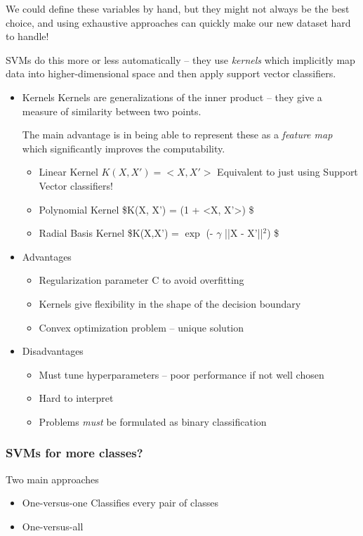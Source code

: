 \documentclass[11pt]{article}
\begin{document}
\begin{itemize}
We could define these variables by hand, but they might not always be the best choice, and using exhaustive approaches can quickly make our new dataset hard to handle!

SVMs do this more or less automatically -- they use \emph{kernels} which implicitly map data into higher-dimensional space and then apply support vector classifiers.

\begin{itemize}
\item Kernels
\label{sec-4-2-3-1}
Kernels are generalizations of the inner product -- they give a measure of similarity between two points.

The main advantage is in being able to represent these as a \emph{feature map} which significantly improves the computability.

\begin{itemize}
\item Linear Kernel
\label{sec-4-2-3-1-1}
$K(X,X') = <X, X'>$
Equivalent to just using Support Vector classifiers!

\item Polynomial Kernel
\label{sec-4-2-3-1-2}
\$K(X, X') = (1 + <X, X'>) \$

\item Radial Basis Kernel
\label{sec-4-2-3-1-3}
\$K(X,X') = $\exp$ (- $\gamma$ ||X - X'||$^{\text{2}}$) \$
\end{itemize}

\item Advantages
\label{sec-4-2-3-2}
\begin{itemize}
\item Regularization parameter C to avoid overfitting
\item Kernels give flexibility in the shape of the decision boundary
\item Convex optimization problem -- unique solution
\end{itemize}
\item Disadvantages
\label{sec-4-2-3-3}
\begin{itemize}
\item Must tune hyperparameters -- poor performance if not well chosen
\item Hard to interpret
\item Problems \emph{must} be formulated as binary classification
\end{itemize}
\end{itemize}
\subsubsection*{SVMs for more classes?}
\label{sec-4-2-4}
Two main approaches
\begin{itemize}
\item One-versus-one
\label{sec-4-2-4-1}
Classifies every pair of classes
\item One-versus-all
\label{sec-4-2-4-2}
\end{itemize}


\end{itemize}
\end{document}
